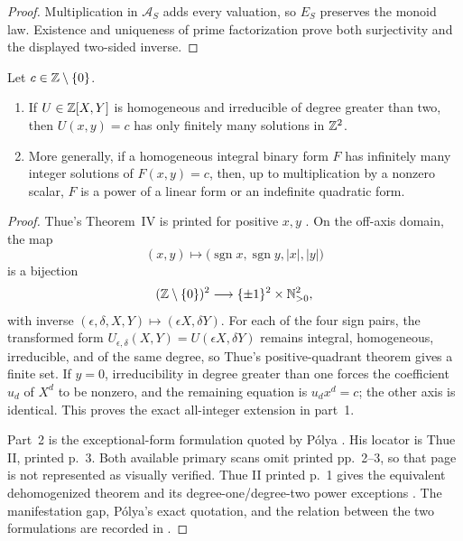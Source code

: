 \begin{proof}
Multiplication in $\mathcal A_S$ adds every valuation, so $E_S$ preserves
the monoid law.  Existence and uniqueness of prime factorization prove both
surjectivity and the displayed two-sided inverse.
\end{proof}

\begin{theorem}
\label{thm:Thue-fixed-binary-form}
Let $c\in\mathbb{Z}\setminus\{0\}$.
\begin{enumerate}
\item If $U\in\mathbb{Z}[X,Y]$ is homogeneous and irreducible of degree greater
than two, then $U(x,y)=c$ has only finitely many solutions in $\mathbb{Z}^2$.
\item More generally, if a homogeneous integral binary form $F$ has
infinitely many integer solutions of $F(x,y)=c$, then, up to multiplication
by a nonzero scalar, $F$ is a power of a linear form or an indefinite
quadratic form.
\end{enumerate}
\end{theorem}

\begin{proof}
Thue's Theorem~IV is printed for positive $x,y$
\cite[pp.~303--304]{Thue1909}.  On the off-axis domain, the map
\[
 (x,y)\longmapsto
 \bigl(\operatorname{sgn}x,\operatorname{sgn}y,|x|,|y|\bigr)
\]
is a bijection
\[
 (\mathbb{Z}\setminus\{0\})^2
 \longrightarrow
 \{\pm1\}^2\times\mathbb{N}_{>0}^2,
\]
with inverse $(\epsilon,\delta,X,Y)\mapsto(\epsilon X,\delta Y)$.
For each of the four sign pairs, the transformed form
$U_{\epsilon,\delta}(X,Y)=U(\epsilon X,\delta Y)$ remains integral,
homogeneous, irreducible, and of the same degree, so Thue's positive-quadrant
theorem gives a finite set.  If $y=0$, irreducibility in degree greater than
one forces the coefficient $u_d$ of $X^d$ to be nonzero, and the remaining
equation is $u_dx^d=c$; the other axis is identical.  This proves the exact
all-integer extension in part~1.

Part~2 is the exceptional-form formulation quoted by P\'olya
\cite[pp.~144--145]{Polya1918}.  His locator is Thue II, printed p.~3.  Both
available primary scans omit printed pp.~2--3, so that page is not represented
as visually verified.  Thue II printed p.~1 gives the equivalent
dehomogenized theorem and its degree-one/degree-two power exceptions
\cite[p.~1]{Thue1908II}.  The manifestation gap, P\'olya's exact quotation,
and the relation between the two formulations are recorded in
.
\end{proof}

